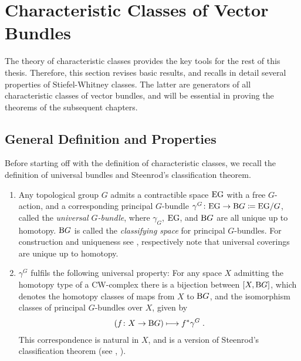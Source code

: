 \section{Characteristic Classes of Vector Bundles}\label{sec:charclsofvb}
The theory of characteristic classes provides the key tools
for the rest of this thesis. Therefore, this section
revises basic results, and recalls in detail several properties
of Stiefel-Whitney classes. The latter are generators of all
characteristic classes of vector bundles, and will be essential in
proving the theorems of the subsequent chapters.

\subsection{General Definition and Properties}
Before starting off with the definition of characteristic classes,
we recall the definition of universal bundles and Steenrod's
classification theorem.
\begin{LemDef}\label{def:charcls}
  \begin{enumerate}
  \item Any topological group $G$ admits a contractible space $\mathrm{E}\mathrm{G}$ with a
    free $G$-action, and a corresponding principal $G$-bundle
    $\gamma^G\colon \mathrm{E}\mathrm{G}\to\mathrm{B}G\coloneqq \mathrm{E}\mathrm{G}/G$, called the
    \emph{universal $G$-bundle},
    where $\gamma_G$, $\mathrm{E}\mathrm{G}$, and $\mathrm{B}G$ are all unique up to
    homotopy.
    $\mathrm{B}G$ is called the \emph{classifying space} for principal
    $G$-bundles.
    For construction and uniqueness see \cite[Example~1B.7~ff.]{hatcher},
    respectively note that universal coverings are unique up to homotopy.
  \item\label{item:classificationthm}
    $\gamma^G$ fulfils the following universal property:
    For any space $X$ admitting the homotopy type of a CW-complex
    there is a bijection between $[X,\mathrm{B}G]$, which denotes the homotopy
    classes of maps from $X$ to $\mathrm{B}G$, and the isomorphism classes of
    principal $G$-bundles over $X$, given by
    \begin{gather*}
      \left(f\colon X\to\mathrm{B}G \right) \longmapsto {f}^* \gamma^G
      \;.
    \end{gather*}
    This correspondence is natural in $X$, and is a version of
    Steenrod's classification theorem
    (see 
    \cite[Theorem~14.4.1]{tomdieck},
    \cite[Theorem~1.4, p.~75]{immersionconj}).
  \end{enumerate}
\end{LemDef}
